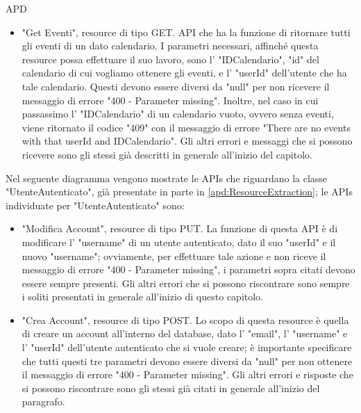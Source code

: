 \begin{listaPersonale} {APD}
\begin{listaPersonale2}[APD]{}
\begin{listaPersonale3}[APD]{}
\begin{itemize}
                \item "Get Eventi", resource di tipo GET. API che ha la funzione di ritornare tutti gli eventi di un dato calendario. I parametri necessari, affinché questa resource possa effettuare il suo lavoro, sono l' "IDCalendario", "id" del calendario di cui vogliamo ottenere gli eventi, e l' "userId" dell'utente che ha tale calendario. Questi devono essere diversi da "null" per non ricevere il messaggio di errore "400 - Parameter missing". Inoltre, nel caso in cui passassimo l' "IDCalendario" di un calendario vuoto, ovvero senza eventi, viene ritornato il codice "409" con il messaggio di errore "There are no events with that userId and IDCalendario". Gli altri errori e messaggi che si possono ricevere sono gli stessi già descritti in generale all'inizio del capitolo.
            \end{itemize}
            \begin{center}
                
            \end{center}
            Nel seguente diagramma vengono mostrate le APIs che riguardano la classe "UtenteAutenticato", già presentate in parte in \ref{apd:ResourceExtraction}; le APIs individuate per "UtenteAutenticato" sono:
            \begin{itemize}
                \item "Modifica Account", resource di tipo PUT. La funzione di questa API è di modificare l' "username" di un utente autenticato, dato il suo "userId" e il nuovo "username"; ovviamente, per effettuare tale azione e non riceve il messaggio di errore "400 - Parameter missing", i parametri sopra citati devono essere sempre presenti. Gli altri errori che si possono riscontrare sono sempre i soliti presentati in generale all'inizio di questo capitolo.
                \item "Crea Account", resource di tipo POST. Lo scopo di questa resource è quella di creare un account all'interno del database, dato l' "email", l' "username" e l' "userId" dell'utente autenticato che si vuole creare; è importante specificare che tutti questi tre parametri devono essere diversi da "null" per non ottenere il messaggio di errore "400 - Parameter missing". Gli altri errori e risposte che si possono riscontrare sono gli stessi già citati in generale all'inizio del paragrafo.

\end{itemize}
\end{listaPersonale3}
\end{listaPersonale2}
\end{listaPersonale}

